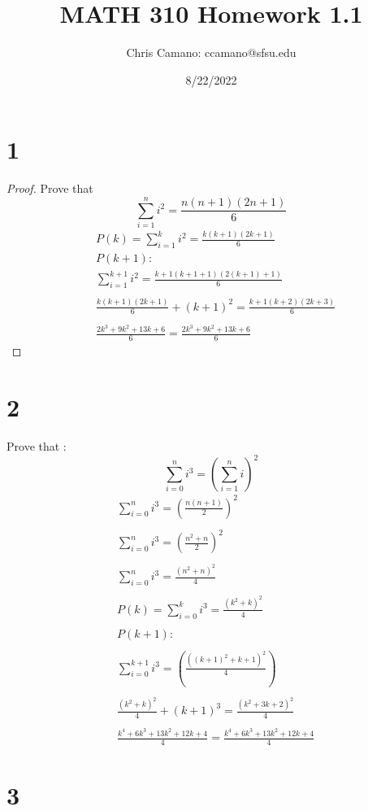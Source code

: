 \documentclass[12pt]{article}
\author{Chris Camano: ccamano@sfsu.edu}
\title{MATH 310  Homework 1.1 }
\date{8/22/2022}
\newcommand{\sect}[1]{\section*{#1}}
\begin{document}
\maketitle
\sect{1}
\begin{proof}
Prove that
\[
  \sum_{i=1}^ni^2=\frac{n(n+1)(2n+1)}{6}
\]
\begin{align*}
  &P(k)=\sum_{i=1}^ki^2=\frac{k(k+1)(2k+1)}{6}\\
  &P(k+1):\\
  &\sum_{i=1}^{k+1}i^2=\frac{k+1(k+1+1)(2(k+1)+1)}{6}\\\\
  &\frac{k(k+1)(2k+1)}{6}+(k+1)^2=\frac{k+1(k+2)(2k+3)}{6}\\\\
  &\frac{2k^3+9k^2+13k+6}{6}=\frac{2k^3+9k^2+13k+6}{6}
\end{align*}
\end{proof}
\sect{2}
Prove that :
\[
  \sum_{i=0}^ni^3=(\sum_{i=1}^ni)^2
\]
\begin{align*}
  &\sum_{i=0}^ni^3=(\frac{n(n+1)}{2})^2\\\\
  &\sum_{i=0}^ni^3=(\frac{n^2+n}{2})^2\\\\
  &\sum_{i=0}^ni^3=\frac{(n^2+n)^2}{4}\\\\
  &P(k)=\sum_{i=0}^ki^3=\frac{(k^2+k)^2}{4}\\\\
  &P(k+1):\\\\
  &\sum_{i=0}^{k+1}i^3=(\frac{((k+1)^2+k+1)^2}{4})\\\\
  &\frac{(k^2+k)^2}{4}+(k+1)^3=\frac{\left(k^2+3k+2\right)^2}{4}\\\\
  &\frac{k^4+6k^3+13k^2+12k+4}{4}=\frac{k^4+6k^3+13k^2+12k+4}{4}
\end{align*}
\sect{3}
\end{document}
